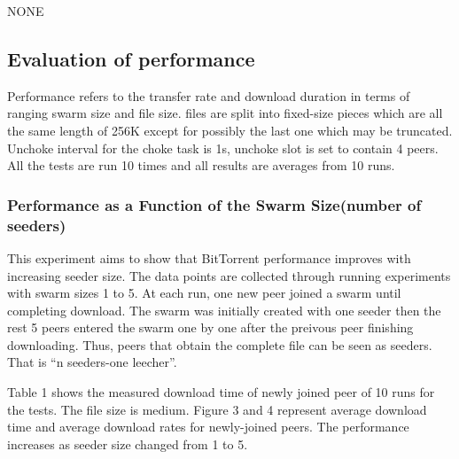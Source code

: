\documentclass[conference]{IEEEtran}
\begin{document}
	
	
	NONE
	
	
	
	
	\subsection{Evaluation of  performance}
	Performance refers to the transfer rate and download duration in terms of ranging swarm size and file size. files are split into fixed-size pieces which are all the same length of 256K except for possibly the last one which may be truncated. Unchoke interval for the choke task is 1s, unchoke slot is set to contain 4 peers. All the tests are run 10 times and all results are averages from 10 runs. 
	
	\subsubsection{Performance as a Function of the Swarm Size(number of seeders)}
	This experiment aims to show that BitTorrent performance improves with increasing seeder size. The data points are collected through running experiments with swarm sizes 1 to 5. At each run, one new peer joined a swarm until completing download. The swarm was initially created with one seeder then the rest 5 peers entered the swarm one by one after the preivous peer finishing downloading. Thus, peers that obtain the complete file can be seen as seeders. That is ``n seeders-one leecher''. 
	
	Table 1 shows the measured download time of newly joined peer of 10 runs for the tests. The file size is medium. Figure 3 and 4 represent average download time and average download rates for newly-joined peers. The performance increases as seeder size changed from 1 to 5. 
	
\end{document}
